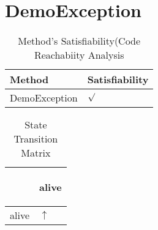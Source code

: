 \documentclass[10pt]{article}
\begin{document}
\section{{\color{Fuchsia}DemoException}}
\label{DemoException}
\begin{longtable}{|l|l|}
\caption{Method's Satisfiability(Code Reachabiity Analysis}\\
\hline
Method & Satisfiability\\
\hline
DemoException&{\color{blue}$\surd$}\\
\hline
\end{longtable}
\begin{longtable}{|l|l|}
\caption{State Transition Matrix}\\
\hline
&\begin{sideways}alive\end{sideways}\\
\hline
alive&{\color{blue}$\uparrow$}\\
\hline
\end{longtable}
\newpage
\end{document}
